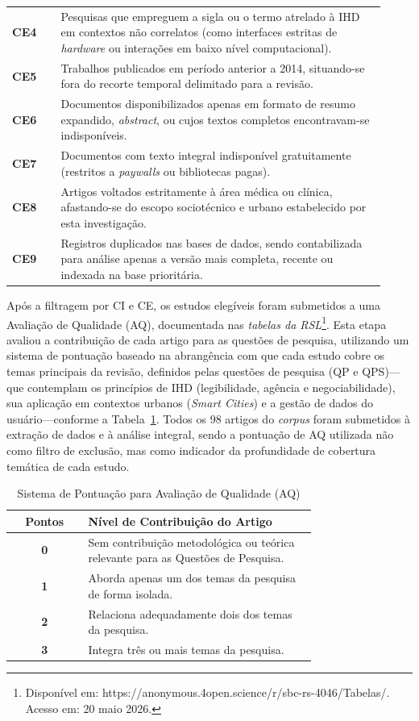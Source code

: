 \documentclass[12pt]{article}
\begin{document}
\begin{table}[H]
\begin{tabular}{p{0.12\linewidth} p{0.8\linewidth}}
\textbf{CE4} & Pesquisas que empreguem a sigla ou o termo atrelado à IHD em contextos não correlatos (como interfaces estritas de \textit{hardware} ou interações em baixo nível computacional). \\
\textbf{CE5} & Trabalhos publicados em período anterior a 2014, situando-se fora do recorte temporal delimitado para a revisão. \\
\textbf{CE6} & Documentos disponibilizados apenas em formato de resumo expandido, \textit{abstract}, ou cujos textos completos encontravam-se indisponíveis. \\
\textbf{CE7} & Documentos com texto integral indisponível gratuitamente (restritos a \textit{paywalls} ou bibliotecas pagas). \\
\textbf{CE8} & Artigos voltados estritamente à área médica ou clínica, afastando-se do escopo sociotécnico e urbano estabelecido por esta investigação. \\
\textbf{CE9} & Registros duplicados nas bases de dados, sendo contabilizada para análise apenas a versão mais completa, recente ou indexada na base prioritária. \\
\hline
\end{tabular}
\end{table}

Após a filtragem por CI e CE, os estudos elegíveis foram submetidos a uma Avaliação de Qualidade (AQ), documentada nas \emph{tabelas da RSL}\footnote{Disponível em: https://anonymous.4open.science/r/sbc-rs-4046/Tabelas/. Acesso em: 20 maio 2026.}. Esta etapa avaliou a contribuição de cada artigo para as questões de pesquisa, utilizando um sistema de pontuação baseado na abrangência com que cada estudo cobre os temas principais da revisão, definidos pelas questões de pesquisa (QP e QPS)---que contemplam os princípios de IHD (legibilidade, agência e negociabilidade), sua aplicação em contextos urbanos (\textit{Smart Cities}) e a gestão de dados do usuário---conforme a Tabela~\ref{tab:qualidade}. Todos os 98 artigos do \textit{corpus} foram submetidos à extração de dados e à análise integral, sendo a pontuação de AQ utilizada não como filtro de exclusão, mas como indicador da profundidade de cobertura temática de cada estudo.

\begin{table}[H]
\centering
\caption{Sistema de Pontuação para Avaliação de Qualidade (AQ)}
\label{tab:qualidade}
\small
\begin{tabular}{c p{0.75\linewidth}}
\hline
\textbf{Pontos} & \textbf{Nível de Contribuição do Artigo} \\ 
\hline
\textbf{0} & Sem contribuição metodológica ou teórica relevante para as Questões de Pesquisa. \\ 
\hline
\textbf{1} & Aborda apenas um dos temas da pesquisa de forma isolada. \\ 
\hline
\textbf{2} & Relaciona adequadamente dois dos temas da pesquisa. \\ 
\hline
\textbf{3} & Integra três ou mais temas da pesquisa. \\ 
\hline
\end{tabular}
\end{table}
\end{document}

